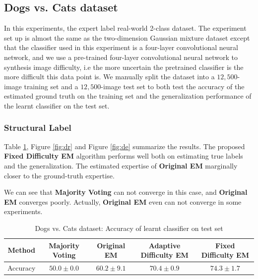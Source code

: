 \subsection{Dogs vs. Cats dataset}

In this experiments, the expert label real-world 2-class dataset. The experiment set up is almost the same as the two-dimension Gaussian mixture dataset except that the classifier used in this experiment is a four-layer convolutional neural network, and we use a pre-trained four-layer convolutional neural network to synthesis image difficulty, i.e the more uncertain the pretrained classifier is the more difficult this data point is.
We manually split the dataset into a $12,500$-image training set and a $12,500$-image test set to both test the accuracy of the estimated ground truth on the training set and the generalization performance of the learnt classifier on the test set.

\subsubsection{Structural Label}
Table \ref{table:dt}, Figure \ref{fig:dr} and Figure \ref{fig:de} summarize the results. The proposed \textbf{Fixed Difficulty EM} algorithm performs well both on estimating true labels and the generalization. The estimated expertise of \textbf{Original EM} marginally closer to the ground-truth expertise. 

We can see that \textbf{Majority Voting} can not converge in this case, and \textbf{Original EM} converges poorly. Actually, \textbf{Original EM} even can not converge in some experiments.


\begin{table}[htp]
\caption{Dogs vs. Cats dataset: Accuracy of learnt classifier on test set}
\label{table:dt}
\begin{center}
\begin{tabular}{c c c c c }
		\toprule
		Method & Majority Voting & Original EM & Adaptive Difficulty EM & Fixed Difficulty EM	 \\
		\midrule
        Accuracy & $50.0 \pm 0.0$  & $60.2 \pm 9.1$ & $70.4 \pm 0.9$ & $\bm{74.3 \pm 1.7}$ \\
		\bottomrule
\end{tabular}
\end{center}
\end{table}

